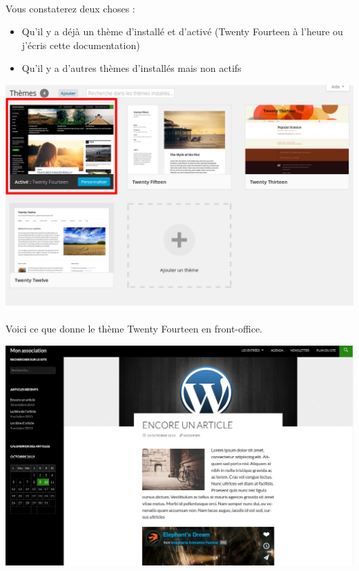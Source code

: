 \documentclass[10pt,a4paper]{article}
\begin{document}
\paragraph{}Vous constaterez deux choses :
\begin{itemize}
\item Qu'il y a déjà un thème d'installé et d'activé (Twenty Fourteen à l'heure ou j'écris cette documentation)
\item Qu'il y a d'autres thèmes d'installés mais non actifs 
\end{itemize}
\begin{center}
\includegraphics[scale=0.3]{img/0235.png}
\end{center}
\newpage
\paragraph{}Voici ce que donne le thème Twenty Fourteen en front-office.
\begin{center}
\includegraphics[scale=0.25]{img/0236.png}
\end{center}
\end{document}

